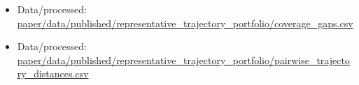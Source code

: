 \begin{itemize}[leftmargin=1.4em,noitemsep]
\item Data/processed: \begingroup\scriptsize\url{paper/data/published/representative_trajectory_portfolio/coverage_gaps.csv}\endgroup
\item Data/processed: \begingroup\scriptsize\url{paper/data/published/representative_trajectory_portfolio/pairwise_trajectory_distances.csv}\endgroup
\end{itemize}
